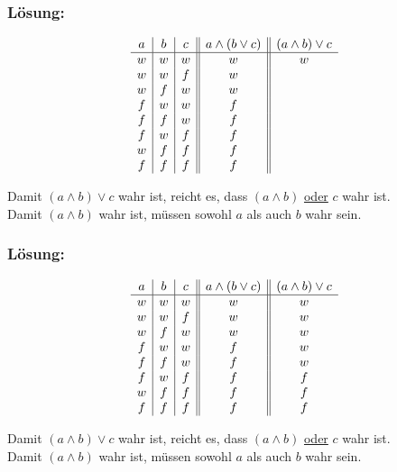 %
%
\begin{frame}\frametitle{Lösung:}

$$
	\begin{array}{c | c | c || c || c}
		a	&b	&c	& a\land (b \lor c)	& (a\land b) \lor c	\\ \hline
		w	&w	&w	& w				& w				\\
		w	&w	&f	& w				& 				\\
		w	&f	&w	& w				& 				\\
		f	&w	&w	& f				& 				\\
		f	&f	&w	& f				& 				\\
		f	&w	&f	& f				& 			\\
		w	&f	&f	& f				& 			\\
		f	&f	&f	& f				& 			\\
	\end{array}
$$

Damit $(a \land b) \lor c$ wahr ist, reicht es, dass $(a\land b)$ \underline{oder} $c$ wahr ist.\\
Damit $(a \land b)$ wahr ist, müssen sowohl $a$ als auch $b$ wahr sein.

\end{frame}
%
%
%
\begin{frame}\frametitle{Lösung:}

$$
	\begin{array}{c | c | c || c || c}
		a	&b	&c	& a\land (b \lor c)	& (a\land b) \lor c	\\ \hline
		w	&w	&w	& w				& w				\\
		w	&w	&f	& w				& w				\\
		w	&f	&w	& w				& w				\\
		f	&w	&w	& f				& w				\\
		f	&f	&w	& f				& w				\\
		f	&w	&f	& f				& f				\\
		w	&f	&f	& f				& f				\\
		f	&f	&f	& f				& f				\\
	\end{array}
$$

Damit $(a \land b) \lor c$ wahr ist, reicht es, dass $(a\land b)$ \underline{oder} $c$ wahr ist.\\
Damit $(a \land b)$ wahr ist, müssen sowohl $a$ als auch $b$ wahr sein.


\end{frame}
%

